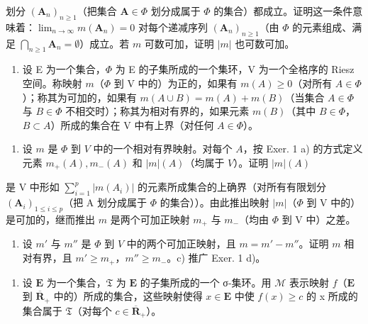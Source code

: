 划分 \((\mathbf{A}_n)_{n\geqslant 1}\)（把集合 \(\mathbf{A}\in \Phi\) 划分成属于 \(\Phi\) 的集合）都成立。证明这一条件意味着：\(\lim_{n\to \infty}m(\mathbf{A}_n) = 0\) 对每个递减序列 \((\mathbf{A}_n)_{n\geqslant 1}\)（由 \(\Phi\) 的元素组成、满足 \(\bigcap_{n\geqslant 1}\mathbf{A}_n = \emptyset\)）成立。若 \(m\) 可数可加，证明 \(|m|\) 也可数可加。

\begin{enumerate}
\def\labelenumi{\arabic{enumi})}
\setcounter{enumi}{1}
\tightlist
\item
  设 E 为一个集合，\(\Phi\) 为 E 的子集所成的一个集环，V 为一个全格序的 Riesz 空间。称映射 \(m\)（\(\Phi\) 到 V 中的）为正的，如果有 \(m(A) \geqslant 0\)（对所有 \(A \in \Phi\)）；称其为可加的，如果有 \(m(A \cup B) = m(A) + m(B)\)（当集合 \(A \in \Phi\) 与 \(B \in \Phi\) 不相交时）；称其为相对有界的，如果元素 \(m(B)\)（其中 \(B \in \Phi\)，\(B \subset A\)）所成的集合在 V 中有上界（对任何 \(A \in \Phi\)）。
\end{enumerate}

\begin{enumerate}
\def\labelenumi{\alph{enumi})}
\tightlist
\item
  设 \(m\) 是 \(\Phi\) 到 \(V\) 中的一个相对有界映射。对每个 \(A\)，按 Exer. 1 a) 的方式定义元素 \(m_{+}(A), m_{-}(A)\) 和 \(|m|(A)\)（均属于 \(V\)）。证明 \(|m|(A)\)
\end{enumerate}

是 V 中形如 \(\sum_{i=1}^{p}|m(A_i)|\) 的元素所成集合的上确界（对所有有限划分 \((\mathbf{A}_i)_{1\leqslant i\leqslant p}\)（把 A 划分成属于 \(\Phi\) 的集合））。由此推出映射 \(|m|\)（\(\Phi\) 到 V 中的）是可加的，继而推出 \(m\) 是两个可加正映射 \(m_{+}\) 与 \(m_{-}\)（均由 \(\Phi\) 到 V 中）之差。

\begin{enumerate}
\def\labelenumi{\alph{enumi})}
\setcounter{enumi}{1}
\tightlist
\item
  设 \(m'\) 与 \(m''\) 是 \(\Phi\) 到 \(V\) 中的两个可加正映射，且 \(m = m' - m''\)。证明 \(m\) 相对有界，且 \(m' \geqslant m_+\)，\(m'' \geqslant m_-\)。c) 推广 Exer. 1 d)。
\end{enumerate}

\begin{enumerate}
\def\labelenumi{\arabic{enumi})}
\setcounter{enumi}{2}
\tightlist
\item
  设 \(\mathbf{E}\) 为一个集合，\(\mathfrak{T}\) 为 \(\mathbf{E}\) 的子集所成的一个 σ-集环。用 \(\mathcal{M}\) 表示映射 \(f\)（\(\mathbf{E}\) 到 \(\overline{\mathbf{R}}_+\) 中的）所成的集合，这些映射使得 \(x \in \mathbf{E}\) 中使 \(f(x) \geqslant c\) 的 x 所成的集合属于 \(\mathfrak{T}\)（对每个 \(c \in \overline{\mathbf{R}}_+\)）。
\end{enumerate}

